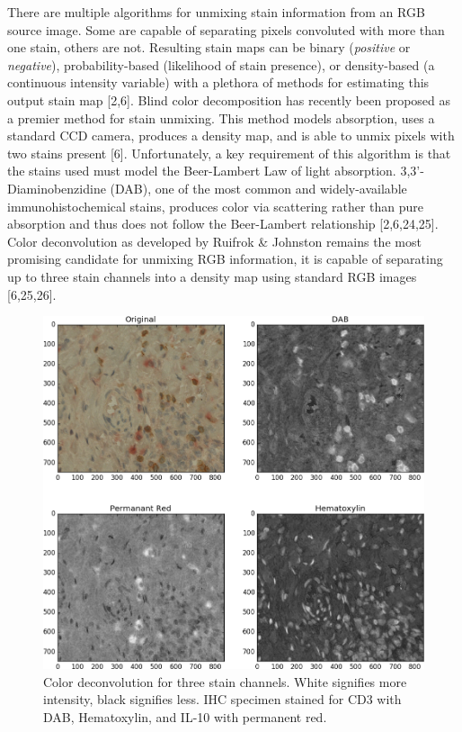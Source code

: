 \documentclass[12pt]{article}
\begin{document}
There are multiple algorithms for unmixing stain information from an RGB source image. Some are capable of separating pixels convoluted with more than one stain, others are not. Resulting stain maps can be binary (\textit{positive} or \textit{negative}), probability-based (likelihood of stain presence), or density-based (a continuous intensity variable) with a plethora of methods for estimating this output stain map [2,6]. Blind color decomposition has recently been proposed as a premier method for stain unmixing. This method models absorption, uses a standard CCD camera, produces a density map, and is able to unmix pixels with two stains present [6]. Unfortunately, a key requirement of this algorithm is that the stains used must model the Beer-Lambert Law of light absorption. 3,3'-Diaminobenzidine (DAB), one of the most common and widely-available immunohistochemical stains, produces color via scattering rather than pure absorption and thus does not follow the Beer-Lambert relationship [2,6,24,25]. Color deconvolution as developed by Ruifrok \& Johnston remains the most promising candidate for unmixing RGB information, it is capable of separating up to three stain channels into a density map using standard RGB images [6,25,26]. 

\begin{figure}[H]
  \includegraphics[width=\linewidth]{CD1.png}
  \caption{Color deconvolution for three stain channels. White signifies more intensity, black signifies less. IHC specimen stained for CD3 with DAB, Hematoxylin, and IL-10 with permanent red.}
  \label{fig:ColorDeconvolution1}
\end{figure}
\end{document}
